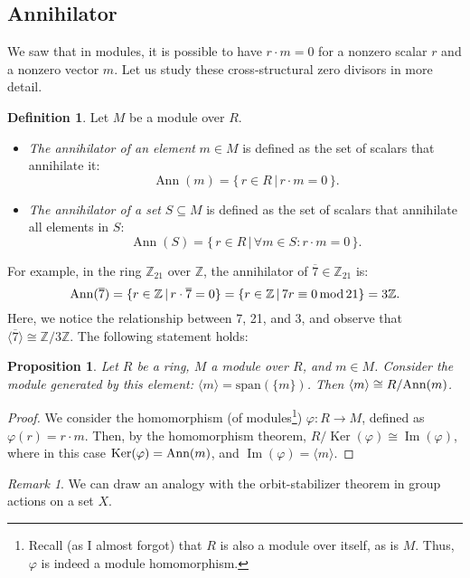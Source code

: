 \documentclass{article}
\newif\ifusemulticols
\theoremstyle{definition}
\newtheorem{deff}{Definition}
\theoremstyle{remark}
\newtheorem*{note}{Remark}
\theoremstyle{plain}
\theoremstyle{plain}
\newtheorem{prop}[theorem]{Proposition}
\newenvironment{mymulticols}
    { \ifusemulticols \begin{multicols}{2} \fi }
    { \ifusemulticols \end{multicols} \fi }
\DeclareMathOperator{\Ker}{Ker}
\DeclareMathOperator{\image}{Im}
\DeclareMathOperator{\Ann}{Ann}
\newcommand{\Z}{\mathbb{Z}}
\begin{document}
\begin{mymulticols}
\subsection{Annihilator}
We saw that in modules, it is possible to have $r \cdot m = 0$ for a nonzero scalar $r$ and a
nonzero vector $m$. Let us study these \quotedblbase cross-structural\quotedblright{} zero divisors in more detail.

\begin{deff}
    Let $M$ be a module over $R$.
    \begin{itemize}
        \item \emph{The annihilator of an element} $m \in M$ is defined as the set of scalars that annihilate it: 
            $$\Ann(m) = \{\, r \in R \, | \, r \cdot m = 0 \,\}.$$
        \item \emph{The annihilator of a set} $S \subseteq M$ is defined as the set of scalars that annihilate all elements in $S$: 
            $$\Ann(S) = \{\, r \in R \, | \, \forall m \in S : r \cdot m = 0 \,\}.$$
    \end{itemize}
\end{deff}

For example, in the ring $\Z_{21}$ over $\Z$, the annihilator of $\overline{7} \in \Z_{21}$ is:
$$\Ann(\overline{7}) = \{ r \in \Z \, | \, r \cdot \overline{7} = 0 \} = \{ r \in \Z \, | \, 7r
\equiv 0 \, \textnormal{mod} \, 21 \} = 3\Z.$$
Here, we notice the relationship between 7, 21, and 3, and observe that $\langle \overline{7}
\rangle \cong \Z / 3\Z$. The following statement holds:

\begin{prop}
    Let $R$ be a ring, $M$ a module over $R$, and $m \in M$. 
    Consider the module generated by this element: $\langle m \rangle = \text{span}(\{m\})$. 
    Then $\langle m \rangle \cong R / \textnormal{Ann}(m)$.
\end{prop}
\begin{proof}
    We consider the homomorphism (of modules\footnote{Recall (as I almost forgot) that $R$ is also a
    module over itself, as is $M$. Thus, $\varphi$ is indeed a module homomorphism.}) $\varphi : R
    \to M$, defined as $\varphi(r) = r \cdot m$.
    Then, by the homomorphism theorem, $R / \Ker(\varphi) \cong \image(\varphi)$, where in this case
    $\Ker(\varphi) = \textnormal{Ann}(m)$, and $\image(\varphi) = \langle m \rangle$.
\end{proof}

\begin{note}
    We can draw an analogy with the orbit-stabilizer theorem in group actions on a set $X$. 


\end{note}
\end{mymulticols}
\end{document}
